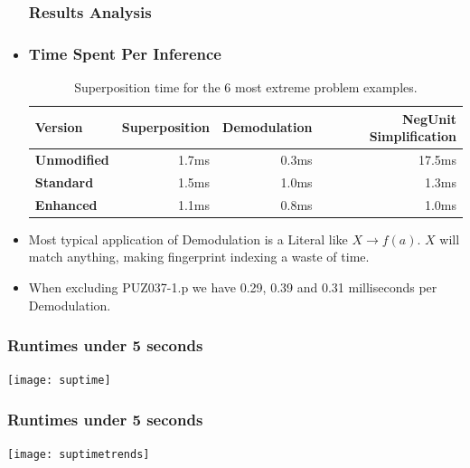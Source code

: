 \documentclass[10pt,xcolor={dvipsnames}]{beamer}
\begin{document}
\begin{NoHyper}
\begin{frame}
  \begin{itemize}
  \frametitle{Results Analysis}
  \item<1->[]
  \frametitle{Time Spent Per Inference}
 \begin{table}[H]\scriptsize
  \caption{Superposition time for the 6 most extreme problem examples.}
\begin{tabular}{| l || r | r | r |}  \hline
Version&Superposition&Demodulation&NegUnit Simplification\\  \hline
\textbf{Unmodified}&1.7ms & 0.3ms & 17.5ms  \\
\textbf{Standard}  &1.5ms & 1.0ms & 1.3ms  \\
\textbf{Enhanced}  &1.1ms & 0.8ms & 1.0ms  \\\hline
\end{tabular}\end{table}  
\item<2-> Most typical application of Demodulation is a Literal like $X \to f(a)$.
$X$ will match anything, making fingerprint indexing a waste of time.
\item<3-> When excluding PUZ037-1.p we have 0.29, 0.39 and 0.31 milliseconds per Demodulation.
  \end{itemize}
\end{frame}



\begin{frame}
  \frametitle{Runtimes under 5 seconds}
  \texttt{[image: suptime]}
\end{frame}

\begin{frame}
  \frametitle{Runtimes under 5 seconds}
  \texttt{[image: suptimetrends]}
\end{frame}



\end{NoHyper}
\end{document}
